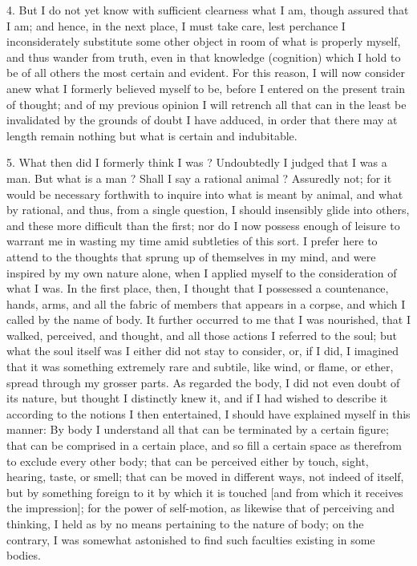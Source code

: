 4. But I do not yet know with sufficient clearness what I am, though assured that I am; and hence, in the next place, I must take care, lest perchance I inconsiderately substitute some other object in room of what is properly myself, and thus wander from truth, even in that knowledge (cognition) which I hold to be of all others the most certain and evident. For this reason, I will now consider anew what I formerly believed myself to be, before I entered on the present train of thought; and of my previous opinion I will retrench all that can in the least be invalidated by the grounds of doubt I have adduced, in order that there may at length remain nothing but what is certain and indubitable.

5. What then did I formerly think I was ? Undoubtedly I judged that I was a man. But what is a man ? Shall I say a rational animal ? Assuredly not; for it would be necessary forthwith to inquire into what is meant by animal, and what by rational, and thus, from a single question, I should insensibly glide into others, and these more difficult than the first; nor do I now possess enough of leisure to warrant me in wasting my time amid subtleties of this sort. I prefer here to attend to the thoughts that sprung up of themselves in my mind, and were inspired by my own nature alone, when I applied myself to the consideration of what I was. In the first place, then, I thought that I possessed a countenance, hands, arms, and all the fabric of members that appears in a corpse, and which I called by the name of body. It further occurred to me that I was nourished, that I walked, perceived, and thought, and all those actions I referred to the soul; but what the soul itself was I either did not stay to consider, or, if I did, I imagined that it was something extremely rare and subtile, like wind, or flame, or ether, spread through my grosser parts. As regarded the body, I did not even doubt of its nature, but thought I distinctly knew it, and if I had wished to describe it according to the notions I then entertained, I should have explained myself in this manner: By body I understand all that can be terminated by a certain figure; that can be comprised in a certain place, and so fill a certain space as therefrom to exclude every other body; that can be perceived either by touch, sight, hearing, taste, or smell; that can be moved in different ways, not indeed of itself, but by something foreign to it by which it is touched [and from which it receives the impression]; for the power of self-motion, as likewise that of perceiving and thinking, I held as by no means pertaining to the nature of body; on the contrary, I was somewhat astonished to find such faculties existing in some bodies.

